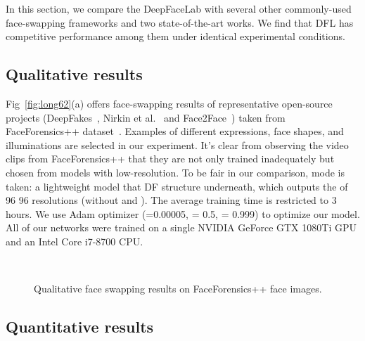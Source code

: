 \documentclass[10pt,twocolumn,letterpaper]{article}
\begin{document}
In this section, we compare the DeepFaceLab with several other commonly-used face-swapping frameworks and two state-of-the-art works. We find that DFL has competitive performance among them under identical experimental conditions.


\subsection{Qualitative results}
\label{section:Qualitative}

Fig~\ref{fig:long62}(a) offers face-swapping results of representative open-source projects (DeepFakes~\cite{Deepfakes}, Nirkin et al.~\cite{nirkin2018_faceswap} and Face2Face~\cite{thies2016face2face}) taken from FaceForensics++ dataset~\cite{faceforensics}. Examples of different expressions, face shapes, and illuminations are selected in our experiment. It's clear from observing the video clips from FaceForensics++ that they are not only trained inadequately but chosen from models with low-resolution. To be fair in our comparison,  mode is taken: a lightweight model that DF structure underneath, which outputs the  of 96  96 resolutions (without  and ). The average training time is restricted to 3 hours. We use Adam optimizer (=0.00005,  = 0.5,  = 0.999) to optimize our model. All of our networks were trained on a single NVIDIA GeForce GTX 1080Ti GPU and an Intel Core i7-8700 CPU.









\begin{figure*}[htbp]
	\centering
	\\
	\centering
	\caption{Qualitative face swapping results on FaceForensics++\cite{faceforensics} face images.}
	\label{fig:long62}
	\label{fig:onecol62}
\end{figure*}


\subsection{Quantitative results}
\end{document}
